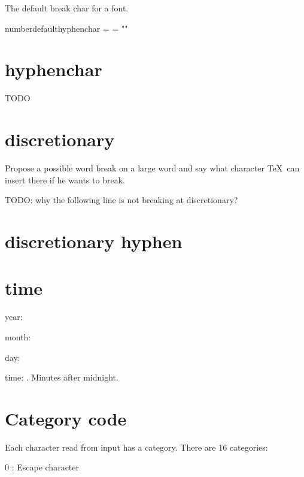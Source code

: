     The default break char for a font.

    \bs number\bs defaulthyphenchar = \number{} = "{\char{}}"

  \section{hyphenchar}

    TODO

  \section{discretionary}

    Propose a possible word break on a large word and say what character \TeX\ can insert there if he wants to break.

    TODO: why the following line is not breaking at discretionary?


  \section{discretionary hyphen}



\section{time}

  year:  \number\year

  month: \number\month

  day:   \number\day

  time:  \number\time. Minutes after midnight.

\section{Category code}

  Each character read from input has a category. There are 16 categories:

  0 : Escape character \bs

